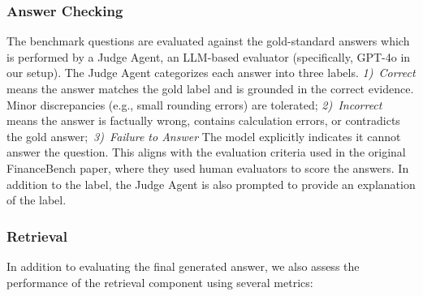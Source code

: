 \documentclass[final,5p,times,twopage,twocolumn,a4paper]{elsarticle}
\begin{document}
\subsubsection{Answer Checking}
The benchmark questions are evaluated against the gold-standard answers which is performed by a Judge Agent, an LLM-based evaluator (specifically, GPT-4o in our setup). The Judge Agent categorizes each answer into three labels. \textit{1)~Correct} means the answer matches the gold label and is grounded in the correct evidence. Minor discrepancies (e.g., small rounding errors) are tolerated; \textit{2)~Incorrect} means the answer is factually wrong, contains calculation errors, or contradicts the gold answer;~\textit{3)~Failure to Answer} The model explicitly indicates it cannot answer the question. This aligns with the evaluation criteria used in the original FinanceBench paper, where they used human evaluators to score the answers. In addition to the label, the Judge Agent is also prompted to provide an explanation of the label.

\subsubsection{Retrieval}
In addition to evaluating the final generated answer, we also assess the performance of the retrieval component using several metrics:
\end{document}

